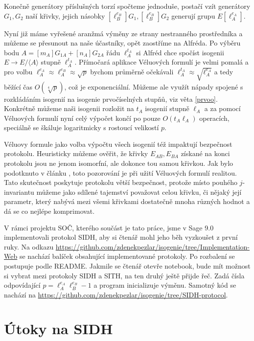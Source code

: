 \documentclass[12pt]{report}
\begin{document}
Konečně generátory příslušných torzí spočteme jednoduše, postačí vzít generátory $G_1,G_2$ naší křivky, jejich násobky $[\ell_B ^{e_B}] G_1, [\ell_B ^{e_B}] G_2$ generují grupu $E[\ell_A ^{e_A}]$.

Nyní již máme vyřešené aranžmá výměny ze strany nestranného prostředníka a můžeme se přesunout na naše účastníky, opět zaostříme na Alfréda. Po výběru bodu $A = [m_A] G_{1A} + [n_A] G_{2A}$ řádu $\ell_A ^{t_A}$ si Alfréd chce spočíst isogenii $E \longrightarrow E/\langle A \rangle$ stupně $\ell_A ^{t_A}$. Přímočará aplikace Véluových formulí je velmi pomalá a pro volbu $\ell_A ^{e_A} \approx \ell_A ^{e_B} \approx \sqrt{p}$ bychom průměrně očekávali $\ell_A ^{t_A} \approx \sqrt{\ell_A ^{e_A}}$ a tedy běžící čas $O(\sqrt[4]{p})$, což je exponenciální. Můžeme ale využít nápady spojené s rozkládáním isogenií na isogenie prvočíselných stupňů, viz věta \ref{prvoo}. Konkrétně můžeme naši isogenii rozložit na $t_A$ isogenií stupně $\ell_A$ a za pomocí Véluových formulí nyní celý výpočet končí po pouze $O(t_A \ell_A)$ operacích, speciálně se škáluje logaritmicky s rostoucí velikostí $p$.

Véluovy formule jako volba výpočtu všech isogenií též impaktují bezpečnost protokolu. Heuristicky můžeme ověřit, že křivky $E_{AB},E_{BA}$ získané na konci protokolu jsou ne jenom isomorfní, ale dokonce tou samou křivkou. Jak bylo podotknuto v článku \cite{Leonardi}, toto pozorování je při užití Véluových formulí realitou. Tato skutečnost poskytuje protokolu větší bezpečnost, protože místo pouhého $j$-invariantu můžeme jako sdílené tajemství považovat celou křivku, či nějaký její parametr, který nabývá mezi všemi křivkami dostatečně mnoha různých hodnot a dá se co nejlépe komprimovat. 

V rámci projektu SOČ, kterého součást je tato práce, jsme v Sage 9.0 implementovali protokol SIDH, aby si čtenář mohl jeho běh vyzkoušet z první ruky. Na odkazu \url{https://github.com/zdenekpezlar/isogenie/tree/Implementation-Web} se nachází balíček obsahující implementované protokoly. Po rozbalení se postupuje podle README. Jakmile se čtenář otevře notebook, bude mít možnost si vybrat mezi protokoly SIDH a SITH, na ten druhý ještě přijde řeč. Zadá čísla odpovídající $p = \ell_A ^{e_A} \ell_B ^{e_B} - 1$ a program inicializuje výměnu. Samotný kód se nachází na \url{https://github.com/zdenekpezlar/isogenie/tree/SIDH-protocol}.

\section{Útoky na SIDH}
\end{document}
